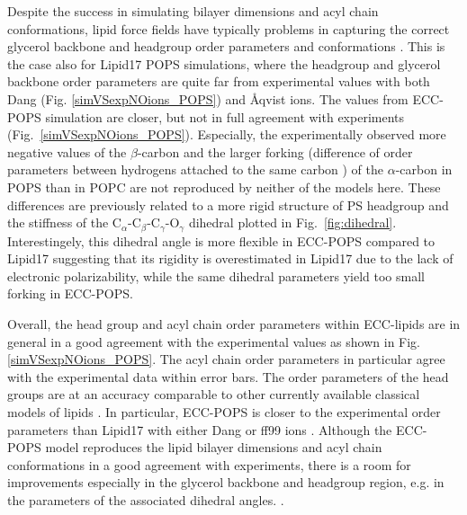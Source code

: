 \documentclass[journal=jpcbfk,manuscript=article]{achemso}
\begin{document}
Despite the success in simulating bilayer dimensions and acyl chain conformations,
lipid force fields have typically problems in capturing the correct glycerol backbone and
headgroup order parameters and conformations \cite{botan15,ollila16,NMRlipidsIV}.
This is the case also for Lipid17 POPS simulations, where the headgroup and glycerol backbone
order parameters are quite far from experimental values with both Dang (Fig. \ref{simVSexpNOions_POPS})
and {\AA}qvist \cite{NMRlipidsIV} ions. The values from ECC-POPS simulation are closer,
but not in full agreement with experiments (Fig.~\ref{simVSexpNOions_POPS}).
Especially, the experimentally observed more negative values of the $\beta$-carbon
and the larger forking (difference of order parameters between hydrogens attached to the
same carbon \cite{ollila16}) of the $\alpha$-carbon in POPS than in POPC \cite{NMRlipidsIV}
are not reproduced by neither of the models here. 
These differences are previously related
to a more rigid structure of PS headgroup and 
the stiffness of the C$_\alpha$-C$_\beta$-C$_\gamma$-O$_\gamma$ dihedral
plotted in Fig.~\ref{fig:dihedral}. 
Interestingely, this dihedral angle is more flexible in ECC-POPS compared to Lipid17 
suggesting that its rigidity is overestimated in Lipid17 due to the lack of electronic polarizability,
while the same dihedral parameters yield too small forking in ECC-POPS.


Overall,
the head group and acyl chain order parameters within ECC-lipids
are in general in a good agreement with the experimental values 
as shown in Fig. \ref{simVSexpNOions_POPS}. 
The acyl chain order parameters in particular agree with the experimental data within error bars.
The order parameters of the head groups are at an accuracy comparable to 
other currently available classical models of lipids \citep{botan15, catte16, Pluhackova2016, nmrlipids_proj4}. 
In particular, ECC-POPS is closer to the experimental order parameters 
than Lipid17 with either Dang \cite{smith94,chang1999,dang2006} 
or ff99 ions \citet{aqvist90}. 
Although the ECC-POPS model reproduces the lipid bilayer dimensions and
acyl chain conformations in a good agreement with experiments, 
there is a room for improvements especially in the glycerol backbone and headgroup region,
e.g. in the parameters of the associated dihedral angles. 
\cite{botan15, ollila16, Pluhackova2016, NMRlipidsIV}.
\end{document}
